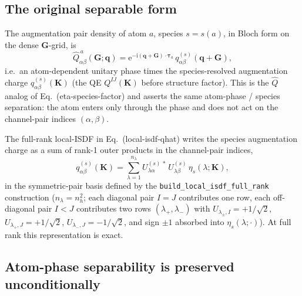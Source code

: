 \documentclass[aps,prb,reprint,superscriptaddress,nofootinbib]{revtex4-2}
\newcommand{\bG}{\mathbf G}
\newcommand{\bq}{\mathbf q}
\newcommand{\btau}{\boldsymbol\tau}
\newcommand{\ee}{\mathrm e}
\newcommand{\ii}{\mathrm i}
\begin{document}
\subsection{The original separable form}

The augmentation pair density of atom \(a\), species \(s=s(a)\), in
Bloch form on the dense \(\bG\)-grid, is
\begin{equation}
\widehat Q^{\,a}_{\alpha\beta}(\bG;\bq)
=\ee^{-\ii(\bq+\bG)\cdot\btau_a}\,
q^{(s)}_{\alpha\beta}(\bq+\bG),
\label{eq:Qhat-species}
\end{equation}
i.e.\ an atom-dependent unitary phase times the species-resolved
augmentation charge \(q^{(s)}_{\alpha\beta}(\mathbf K)\) (the QE
\(Q^{IJ}(\mathbf K)\) before structure factor).  This is the
\(\widehat Q\) analog of Eq.~(eta-species-factor) and asserts the
same atom-phase / species separation: the atom enters only through the
phase and does not act on the channel-pair indices \((\alpha,\beta)\).

The full-rank local-ISDF in Eq.~(local-isdf-qhat) writes the species
augmentation charge as a sum of rank-1 outer products in the
channel-pair indices,
\begin{equation}
q^{(s)}_{\alpha\beta}(\mathbf K)
=\sum_{\lambda=1}^{n_\lambda}
U^{(s)\,*}_{\lambda\alpha}\,
U^{(s)}_{\lambda\beta}\,
\eta_s(\lambda;\mathbf K),
\label{eq:Qhat-full-rank}
\end{equation}
in the symmetric-pair basis defined by the
\texttt{build\_local\_isdf\_full\_rank} construction
(\(n_\lambda=n_h^2\); each diagonal pair \(I=J\) contributes one row,
each off-diagonal pair \(I<J\) contributes two rows
\((\lambda_+,\lambda_-)\) with \(U_{\lambda_\pm,I}=+1/\sqrt2\),
\(U_{\lambda_+,J}=+1/\sqrt2\), \(U_{\lambda_-,J}=-1/\sqrt2\), and
sign \(\pm1\) absorbed into \(\eta_s(\lambda;\cdot)\)).  At full rank
this representation is exact.

\subsection{Atom-phase separability is preserved unconditionally}
\end{document}
